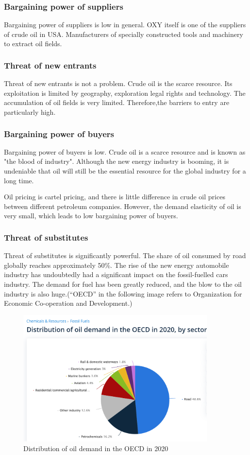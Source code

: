 \documentclass[
	a4paper, %
	12pt,%
]{CSSullivanBusinessReport}
\begin{document}
\begin{fullwidth}
\subsubsection{Bargaining power of suppliers} 
Bargaining power of suppliers is low in general. OXY itself is one of the suppliers of crude oil in USA. Manufacturers of specially constructed tools and machinery to extract oil fields.
\subsubsection{Threat of new entrants}
Threat of new entrants is not a problem. Crude oil is the scarce resource. Its exploitation is limited by geography, exploration legal rights and technology. The accumulation of oil fields is very limited. Therefore,the barriers to entry are particularly high.
\subsubsection{Bargaining power of buyers}
Bargaining power of buyers is low. Crude oil is a scarce resource and is known as "the blood of industry". Although the new energy industry is booming, it is undeniable that oil will still be the essential resource for the global industry for a long time.\par
Oil pricing is cartel pricing, and there is little difference in crude oil prices between different petroleum companies. However, the demand elasticity of oil is very small, which leads to low bargaining power of buyers.
\subsubsection{Threat of substitutes}
Threat of substitutes is significantly powerful. The share of oil consumed by road globally reaches approximately 50\%. The rise of the new energy automobile industry has undoubtedly had a significant impact on the fossil-fuelled cars industry. The demand for fuel has been greatly reduced, and the blow to the oil industry is also huge.(“OECD” in the following image refers to Organization for Economic Co-operation and Development.)
\begin{figure}
    \centering
    \includegraphics[width=10cm]{Images/Threat of substitute.png}
    \caption{Distribution of oil demand in the OECD in 2020}
    \label{Distribution of oil demand in the OECD in 2020}
\end{figure}

\end{fullwidth}
\end{document}
